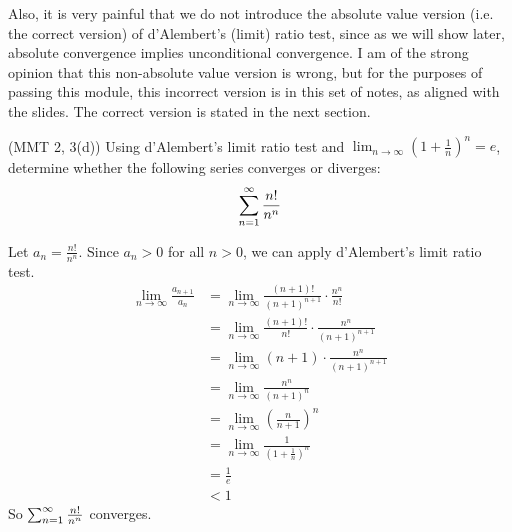 Also, it is very painful that we do not introduce the absolute value version (i.e. the correct version) of d'Alembert's (limit) ratio test, since as we will show later, absolute convergence implies unconditional convergence. I am of the strong opinion that this non-absolute value version is wrong, but for the purposes of passing this module, this incorrect version is in this set of notes, as aligned with the slides. The correct version is stated in the next section.
\begin{eg}
  (MMT 2, 3(d)) Using d'Alembert's limit ratio test and $\lim_{n \to \infty} (1 + \frac{1}{n}) ^ n = e$, determine whether the following series converges or diverges:
  \[
    \sum_{n = 1} ^ \infty \frac{n!}{n ^ n}
  \]
\end{eg}
\begin{solution}
  Let $a_n = \frac{n!}{n ^ n}$. Since $a_n > 0$ for all $n > 0$, we can apply d'Alembert's limit ratio test.
  \begin{align*}
    \lim_{n \to \infty} \frac{a_{n + 1}}{a_n} &= \lim_{n \to \infty} \frac{(n + 1)!}{(n + 1) ^ {n + 1}} \cdot \frac{n ^ n}{n!} \\ 
    &= \lim_{n \to \infty} \frac{(n + 1)!}{n!} \cdot \frac{n ^ n}{(n + 1) ^ {n + 1}} \\ 
    &= \lim_{n \to \infty} (n + 1) \cdot \frac{n ^ n}{(n + 1) ^ {n + 1}} \\ 
    &= \lim_{n \to \infty} \frac{n ^ n}{(n + 1) ^ n} \\ 
    &= \lim_{n \to \infty} (\frac{n}{n + 1}) ^ n \\ 
    &= \lim_{n \to \infty} \frac{1}{(1 + \frac{1}{n}) ^ n} \\ 
    &= \frac{1}{e} \\ 
    &< 1
  \end{align*}
  So $\sum_{n = 1} ^ \infty \frac{n!}{n ^ n}$ converges.
\end{solution}


